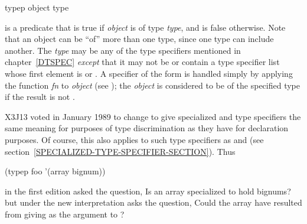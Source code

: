 \begin{defun}[Function]
typep object type

 is a predicate that
is true if {\it object} is of type {\it type}, and is false otherwise.
Note that an object can be ``of'' more than one type, since one type can
include another.  The {\it type} may be any of the type specifiers
mentioned in chapter~\ref{DTSPEC} {\it except} that it may not
be or contain a type specifier list whose first element is 
or .
A specifier of the form  is handled simply
by applying the function {\it fn} to {\it object}
(see ); the {\it object} is considered
to be of the specified type if the result is not {\false}.

\begin{new}
X3J13 voted in January 1989
to change  to give specialized
 and  type specifiers the same meaning for
purposes of type discrimination as they have for declaration purposes.
Of course, this also applies to such type specifiers as 
and 
(see section~\ref{SPECIALIZED-TYPE-SPECIFIER-SECTION}).
Thus
\begin{lisp}
(typep foo '(array bignum))
\end{lisp}
in the first edition asked the question, Is  an array
specialized to hold bignums? but under the new interpretation
asks the question, Could the array  have resulted from
giving  as the  argument
to ?
\end{new}
\end{defun}

